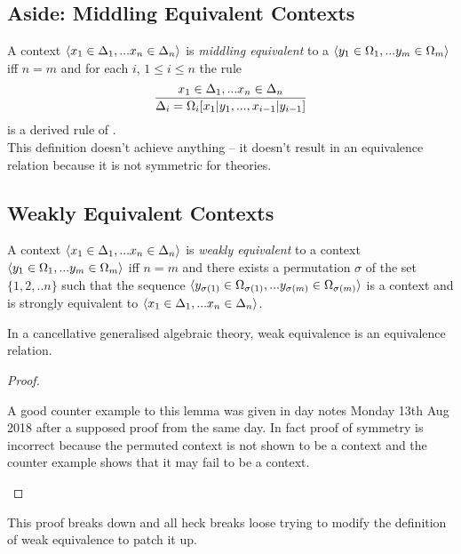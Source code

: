 \documentclass[10pt,a4paper]{scrartcl}
\begin{document}
\begin{oldtt}
\subsection{Aside: Middling Equivalent Contexts}

A context $\langle x_1 \in \Delta_1,... x_{n} \in \Delta_{n}\rangle$ 
is  \textit{middling equivalent}  to a $\langle y_1 \in \Omega_1,... y_{m} \in \Omega_{m}\rangle$ iff $n=m$ and for each $i$, $1 \leq i \leq n$ the rule 
$$
\frac{x_1 \in \Delta_1,... x_{n} \in \Delta_{n}}{\Delta_i=\Omega_i[x_1|y_1,...,x_{i-1}|y_{i-1}]}
$$
is a derived rule of \gat. \\

This definition doesn't achieve anything -- it doesn't result in an equivalence relation because it is not symmetric for 
 theories.
\end{oldtt}
\subsection{Weakly Equivalent Contexts}
\begin{definition}
A context $\langle x_1 \in \Delta_1,... x_{n} \in \Delta_{n}\rangle$ 
is \textit{weakly equivalent} to a context $\langle y_1 \in \Omega_1,... y_{m} \in \Omega_{m}\rangle$  iff $n=m$ and there exists a permutation $\sigma$ of the set $\{1,2,..n\}$
such that the sequence 
$\langle y_{\sigma(1)} \in \Omega_{\sigma(1)},... y_{\sigma(m)} \in \Omega_{\sigma(m)}\rangle$
is a context and 
is strongly equivalent to $\langle x_1 \in \Delta_1,... x_{n} \in \Delta_{n}\rangle$.
\end{definition}
\begin{lemma}
In a cancellative generalised algebraic theory, weak equivalence is an
equivalence relation.
\end{lemma}
\begin{proof}
\tbd{}

\begin{framed}
A good counter example to this lemma was given in day notes Monday 13th Aug 2018 after a supposed proof from the same day.
In fact proof of symmetry is incorrect because the permuted context is not shown to be a context and the counter example shows that
it may fail to be a context.
\end{framed}
\end{proof}

\begin{framed}
This proof breaks down and all heck breaks loose trying to modify the definition of weak equivalence to patch it up.
\end{framed}
\end{document}
